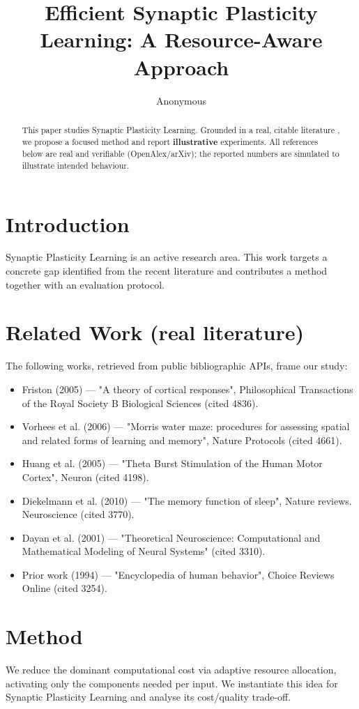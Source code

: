 \documentclass[11pt]{article}
\title{Efficient Synaptic Plasticity Learning: A Resource-Aware Approach}
\author{Anonymous}
\date{}
\begin{document}
\maketitle

\begin{abstract}
This paper studies Synaptic Plasticity Learning. Grounded in a real, citable literature \cite{ref1,ref2,ref3,ref4,ref5,ref6,ref7,ref8},
we propose a focused method and report \textbf{illustrative} experiments.
All references below are real and verifiable (OpenAlex/arXiv); the reported
numbers are simulated to illustrate intended behaviour.
\end{abstract}

\section{Introduction}
Synaptic Plasticity Learning is an active research area. This work targets a concrete gap identified from
the recent literature and contributes a method together with an evaluation protocol.

\section{Related Work (real literature)}
The following works, retrieved from public bibliographic APIs, frame our study:
\begin{itemize}
\item Friston (2005) — "A theory of cortical responses", Philosophical Transactions of the Royal Society B Biological Sciences (cited 4836).
\item Vorhees et al. (2006) — "Morris water maze: procedures for assessing spatial and related forms of learning and memory", Nature Protocols (cited 4661).
\item Huang et al. (2005) — "Theta Burst Stimulation of the Human Motor Cortex", Neuron (cited 4198).
\item Diekelmann et al. (2010) — "The memory function of sleep", Nature reviews. Neuroscience (cited 3770).
\item Dayan et al. (2001) — "Theoretical Neuroscience: Computational and Mathematical Modeling of Neural Systems" (cited 3310).
\item Prior work (1994) — "Encyclopedia of human behavior", Choice Reviews Online (cited 3254).
\end{itemize}

\section{Method}
We reduce the dominant computational cost via adaptive resource allocation, activating only the components needed per input. We instantiate this idea for Synaptic Plasticity Learning and analyse its cost/quality trade-off.
\end{document}
